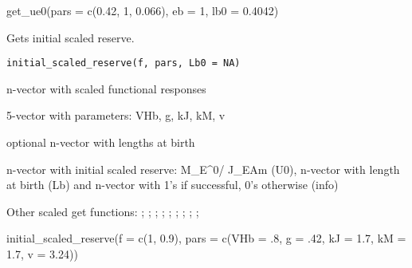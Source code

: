\documentclass[a4paper]{book}
\begin{document}
%
\begin{Examples}
\begin{ExampleCode}
get_ue0(pars = c(0.42, 1, 0.066), eb = 1, lb0 = 0.4042)
\end{ExampleCode}
\end{Examples}
%
\begin{Description}\relax
Gets initial scaled reserve.
\end{Description}
%
\begin{Usage}
\begin{verbatim}
initial_scaled_reserve(f, pars, Lb0 = NA)
\end{verbatim}
\end{Usage}
%
\begin{Arguments}
\begin{ldescription}
\item[\code{f}] n-vector with scaled functional responses

\item[\code{pars}] 5-vector with parameters: VHb, g, kJ, kM, v

\item[\code{Lb0}] optional n-vector with lengths at birth
\end{ldescription}
\end{Arguments}
%
\begin{Value}
n-vector with initial scaled reserve: M\_E\textasciicircum{}0/ J\_EAm (U0), n-vector with length at birth (Lb) and n-vector with 1's if successful, 0's otherwise (info)
\end{Value}
%
\begin{SeeAlso}\relax
Other scaled get functions: ;
; ;
; ;
; ;
; ;
\end{SeeAlso}
%
\begin{Examples}
\begin{ExampleCode}
initial_scaled_reserve(f = c(1, 0.9), pars = c(VHb = .8, g = .42, kJ = 1.7, kM = 1.7, v = 3.24))
\end{ExampleCode}
\end{Examples}
\end{document}
